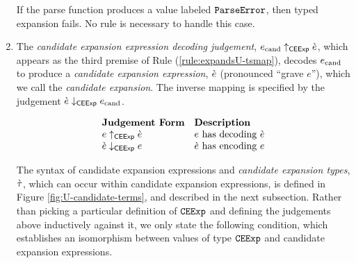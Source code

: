 \begin{enumerate}
If the parse function produces a value labeled $\mathtt{ParseError}$, then typed expansion fails. No rule is necessary to handle this case. 

\item The \emph{candidate expansion expression decoding judgement}, $e_\text{cand} \uparrow_\mathsf{CEExp} \grave{e}$, which appears as the third premise of Rule (\ref{rule:expandsU-tsmap}), decodes $e_\text{cand}$ to produce a \emph{candidate expansion expression}, $\grave{e}$  (pronounced ``grave $e$''), which we call the \emph{candidate expansion}. 
The inverse mapping is specified by the judgement $\grave{e} \downarrow_\mathsf{CEExp} e_\text{cand}$. 

\[\begin{array}{ll}
\textbf{Judgement Form} & \textbf{Description}\\
e \uparrow_\mathsf{CEExp} \grave{e} & \text{$e$ has decoding $\grave{e}$}\\
\grave{e} \downarrow_\mathsf{CEExp} e & \text{$\grave{e}$ has encoding $e$}
\end{array}\]

The syntax of candidate expansion expressions and \emph{candidate expansion types}, $\grave{\tau}$, which can occur within candidate expansion expressions, is defined in Figure \ref{fig:U-candidate-terms}, and described in the next subsection. Rather than picking a particular definition of $\mathtt{CEExp}$ and defining the judgements above inductively against it, we only state the following condition, which establishes an isomorphism between values of type $\mathtt{CEExp}$ and candidate expansion expressions.



\end{enumerate}
